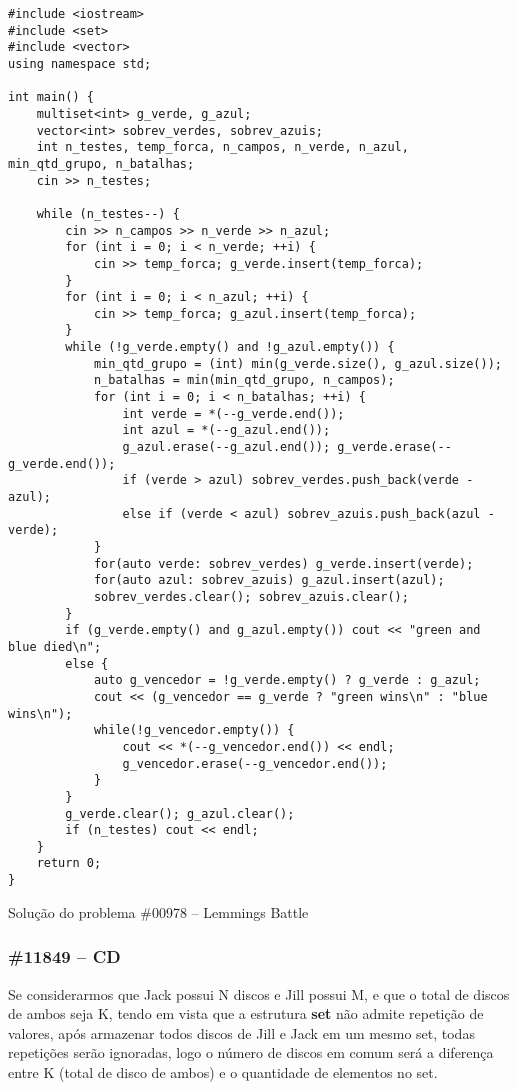 \documentclass[a4paper,12pt]{scrartcl}
\begin{document}
\begin{listing}[H]
\begin{verbatim}
#include <iostream>
#include <set>
#include <vector>
using namespace std;

int main() {
    multiset<int> g_verde, g_azul;
    vector<int> sobrev_verdes, sobrev_azuis;
    int n_testes, temp_forca, n_campos, n_verde, n_azul, min_qtd_grupo, n_batalhas;
    cin >> n_testes;

    while (n_testes--) {
        cin >> n_campos >> n_verde >> n_azul;
        for (int i = 0; i < n_verde; ++i) {
            cin >> temp_forca; g_verde.insert(temp_forca);
        }
        for (int i = 0; i < n_azul; ++i) {
            cin >> temp_forca; g_azul.insert(temp_forca);
        }
        while (!g_verde.empty() and !g_azul.empty()) {
            min_qtd_grupo = (int) min(g_verde.size(), g_azul.size());
            n_batalhas = min(min_qtd_grupo, n_campos);
            for (int i = 0; i < n_batalhas; ++i) {
                int verde = *(--g_verde.end());
                int azul = *(--g_azul.end());
                g_azul.erase(--g_azul.end()); g_verde.erase(--g_verde.end());
                if (verde > azul) sobrev_verdes.push_back(verde - azul);
                else if (verde < azul) sobrev_azuis.push_back(azul - verde);
            }
            for(auto verde: sobrev_verdes) g_verde.insert(verde);
            for(auto azul: sobrev_azuis) g_azul.insert(azul);
            sobrev_verdes.clear(); sobrev_azuis.clear();
        }
        if (g_verde.empty() and g_azul.empty()) cout << "green and blue died\n";
        else {
            auto g_vencedor = !g_verde.empty() ? g_verde : g_azul;
            cout << (g_vencedor == g_verde ? "green wins\n" : "blue wins\n");
            while(!g_vencedor.empty()) {
                cout << *(--g_vencedor.end()) << endl;
                g_vencedor.erase(--g_vencedor.end());
            }
        }
        g_verde.clear(); g_azul.clear();
        if (n_testes) cout << endl;
    }
    return 0;
}
\end{verbatim}
\caption{\footnotesize{Solução do problema \#00978 – Lemmings Battle}}
\end{listing}

\subsubsection{\#11849 – CD}
Se considerarmos que Jack possui N discos e Jill possui M, e que o total de discos de ambos seja K, tendo em vista que a estrutura \textbf{set} não admite repetição de valores, após armazenar todos discos de Jill e Jack em um mesmo set, todas repetições serão ignoradas, logo o número de discos em comum será a diferença entre K (total de disco de ambos) e o quantidade de elementos no set.
\end{document}
